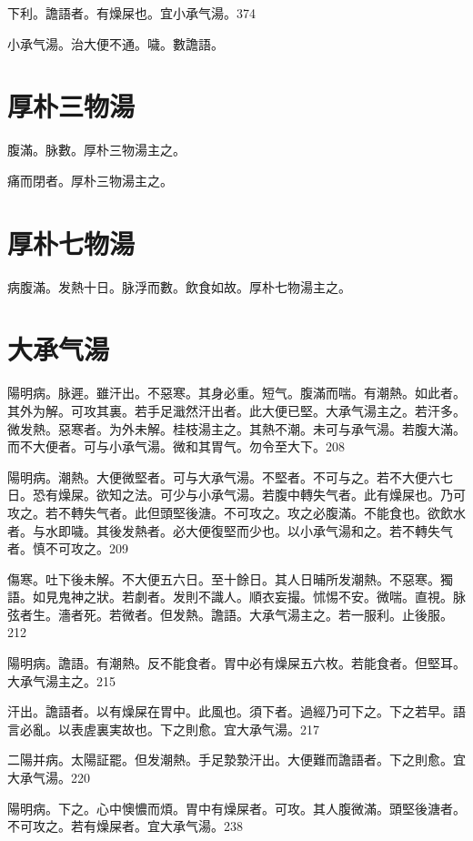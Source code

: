 下利。譫語者。有燥屎也。宜{\khaaitp 小}承气湯。374

小承气湯。治大便不通。噦。數譫語。

\section{厚朴三物湯}

腹滿。脉數。厚朴三物湯主之。{\wuben}

痛而閉者。厚朴三物湯主之。{\dengben}

\section{厚朴七物湯}

病腹滿。发熱十日。脉浮而數。飲食如故。厚朴七物湯主之。

\section{大承气湯}

陽明病。脉遲。雖汗出。不惡寒。其身必重。短气。腹滿而喘。有潮熱。如此者。其外为解。可攻其裏。若手足濈然汗出者。此大便已堅。{\khaaitp 大}承气湯主之。若汗多。微发熱。惡寒者。为外未解。{\khaaitp 桂枝湯主之。}其熱不潮。未可与承气湯。若腹大滿。而不大便者。可与小承气湯。微和其胃气。勿令至大下。208

陽明病。潮熱。大便微堅者。可与{\khaaitp 大}承气湯。不堅者。不可与之。若不大便六七日。恐有燥屎。欲知之法。可少与小承气湯。若腹中轉失气者。此有燥屎也。乃可攻之。若不轉失气者。此但頭堅後溏。不可攻之。攻之必腹滿。不能食也。欲飲水者。与水即噦。其後发熱者。必大便復堅而少也。以小承气湯和之。若不轉失气者。慎不可攻之。209

傷寒。吐下後未解。不大便五六日。至十餘日。其人日晡所发潮熱。不惡寒。獨語。如見鬼{\khaaitp 神之}狀。若劇者。发則不識人。順衣妄撮。怵惕不安。微喘。直視。脉弦者生。濇者死。{\khaaitp 若}微者。但发熱。譫語。{\khaaitp 大}承气湯主之。若一服利。止後服。212

陽明病。譫語。有潮熱。反不能食者。{\khaaitp 胃中}必有燥屎五六枚。若能食者。但堅耳。{\khaaitp 大}承气湯主之。215

汗出。譫語者。以有燥屎在胃中。此風也。{\khaaitp 須下者。}過經乃可下之。下之若早。語言必亂。以表虗裏実故也。下之則愈。宜{\khaaitp 大}承气湯。217

二陽并病。太陽証罷。但发潮熱。手足漐漐汗出。大便難而譫語者。下之則愈。宜{\khaaitp 大}承气湯。220

陽明病。下之。心中懊憹而煩。胃中有燥屎者。可攻。其人腹微滿。頭堅後溏者。不可攻之。若有燥屎者。宜{\khaaitp 大}承气湯。238

